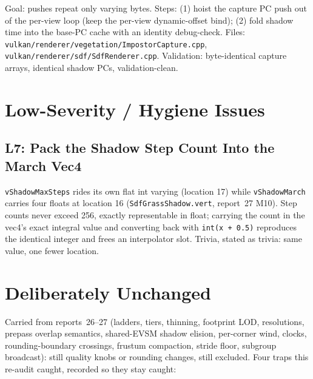 \documentclass[11pt,a4paper]{article}
\begin{document}
\begin{tcolorbox}[promptbox={Prompt --- M6: invariant push batching}]
Goal: pushes repeat only varying bytes. Steps: (1) hoist the capture PC
push out of the per-view loop (keep the per-view dynamic-offset bind);
(2) fold shadow time into the base-PC cache with an identity
debug-check. Files:
\texttt{vulkan/renderer/vegetation/ImpostorCapture.cpp},
\texttt{vulkan/renderer/sdf/SdfRenderer.cpp}. Validation: byte-identical
capture arrays, identical shadow PCs, validation-clean.
\end{tcolorbox}

\section{Low-Severity / Hygiene Issues}

\subsection{L7: Pack the Shadow Step Count Into the March Vec4}

\texttt{vShadowMaxSteps} rides its own flat int varying (location 17)
while \texttt{vShadowMarch} carries four floats at location 16
(\texttt{SdfGrassShadow.vert}, report~27 M10). Step counts never exceed 256,
exactly representable in float; carrying the count in the vec4's exact
integral value and converting back with \texttt{int(x + 0.5)} reproduces
the identical integer and frees an interpolator slot. Trivia, stated as
trivia: same value, one fewer location.

\section{Deliberately Unchanged}
\label{sec:unchanged28}

Carried from reports~26--27 (ladders, tiers, thinning, footprint LOD,
resolutions, prepass overlap semantics, shared-EVSM shadow elision,
per-corner wind, clocks, rounding-boundary crossings, frustum compaction,
stride floor, subgroup broadcast): still quality knobs or rounding changes,
still excluded. Four traps this re-audit caught, recorded so they stay
caught:
\end{document}
